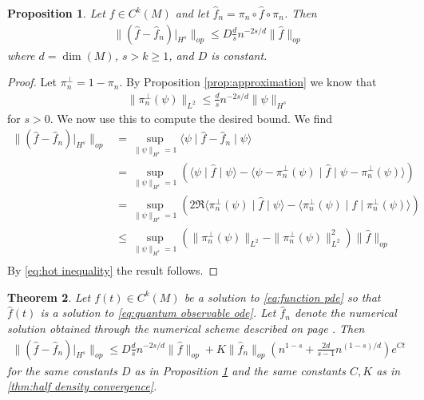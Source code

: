 \documentclass[12pt]{amsart}
\newtheorem{thm}{Theorem}[section]
\newtheorem{prop}[thm]{Proposition}
\begin{document}
\begin{prop} \label{prop:function approximation}
	Let $f \in C^{k}(M)$ and let $\hat{f}_{n} = \pi_{n} \circ \hat{f} \circ \pi_{n}$.  Then
	\begin{align*}
		\| ( \hat{f} - \hat{f}_{n} )|_{H^{s}} \|_{op} \leq D \frac{d}{s} n^{-2s/d} \| \hat{f} \|_{op}
	\end{align*}
	where $d= \dim(M)$, $s > k \geq 1$, and $D$ is constant.
\end{prop}
\begin{proof}
	Let $\pi_{n}^{\perp} = 1 - \pi_{n}$.  By Proposition \ref{prop:approximation} we know that
	\begin{align}
		\| \pi_{n}^{\perp}(\psi) \|_{L^{2}} \leq \frac{d}{s} n^{-2s/d} \| \psi \|_{H^{s}} \label{eq:hot inequality}
	\end{align}
	for $s>0$.  We now use this to compute the desired bound.  We find
	\begin{align*}
		\| (\hat{f} - \hat{f}_{n})|_{H^{s}} \|_{op} &= \sup_{\| \psi \|_{H^{s}}=1} \langle \psi \mid \hat{f} - \hat{f}_{n} \mid \psi \rangle \\
			&= \sup_{\| \psi \|_{H^{s}}=1} \left( \langle \psi \mid \hat{f}  \mid \psi \rangle - \langle \psi - \pi_{n}^{\perp}(\psi) \mid \hat{f} \mid \psi - \pi_{n}^{\perp}(\psi) \rangle \right) \\
			&= \sup_{\| \psi \|_{H^{s}}=1} \left( 2 \Re \langle \pi_{n}^{\perp}(\psi) \mid \hat{f} \mid \psi \rangle - \langle \pi_{n}^{\perp}(\psi) \mid \hat{f} \mid \pi_{n}^{\perp}(\psi) \rangle \right) \\
			&\leq \sup_{\| \psi \|_{H^{s}}=1}  ( \| \pi_{n}^{\perp}(\psi) \|_{L^{2}}- \| \pi_{n}^{\perp}(\psi) \|_{L^{2}}^{2} ) \| \hat{f} \|_{op} \\
	\end{align*}
	By \eqref{eq:hot inequality} the result follows.
\end{proof}

\begin{thm} \label{thm:function convergence}
	Let $f(t) \in C^{k}(M)$ be a solution to \eqref{eq:function pde} so that $\hat{f}(t)$ is a solution to \eqref{eq:quantum observable ode}.
	Let $\hat{f}_{n}$ denote the numerical solution obtained through the numerical scheme described on page \pageref{function scheme}.
	Then
	\begin{align*}
		\| ( \hat{f} - \hat{f}_{n})|_{H^{s}} \|_{op} \leq D \frac{d}{s} n^{-2s/d} \| \hat{f} \|_{op}+  K \| \hat{f}_{n} \|_{op} \left( n^{1-s} + \frac{2d}{s -1} n^{(1-s)/d} \right) e^{Ct}
	\end{align*}
	for the same constants $D$ as in Proposition \ref{prop:function approximation} and the same constants $C,K$ as in \ref{thm:half density convergence}.
\end{thm}
\end{document}
